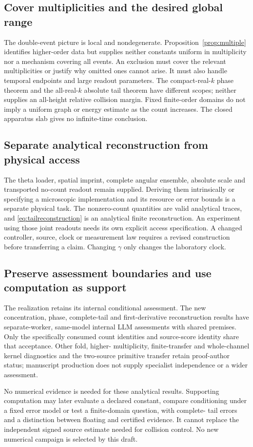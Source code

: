 \subsection{Cover multiplicities and the desired global range}
The double-event picture is local and nondegenerate.
Proposition~\ref{prop:multiple} identifies higher-order data but supplies
neither constants uniform in multiplicity nor a mechanism covering all
events. An exclusion must cover the relevant multiplicities or justify
why omitted ones cannot arise. It must also handle temporal endpoints and
large readout parameters. The compact-real-$k$ phase theorem and the
all-real-$k$ absolute tail theorem have different scopes; neither supplies
an all-height relative collision margin. Fixed finite-order domains do not
imply a uniform graph or energy estimate as the count increases. The
closed apparatus slab gives no infinite-time conclusion.

\subsection{Separate analytical reconstruction from physical access}
The theta loader, spatial imprint, complete angular ensemble, absolute
scale and transported no-count readout remain supplied. Deriving them
intrinsically or specifying a microscopic implementation and its resource
or error bounds is a separate physical task. The nonzero-count quantities
are valid analytical traces, and \eqref{eq:tailreconstruction} is an
analytical finite reconstruction. An experiment using those joint
readouts needs its own explicit access specification. A changed controller,
source, clock or measurement law requires a revised construction before
transferring a claim. Changing $\gamma$ only changes the laboratory clock.

\subsection{Preserve assessment boundaries and use computation as support}
The realization retains its internal conditional assessment. The new
concentration, phase, complete-tail and first-derivative reconstruction
results have separate-worker, same-model internal LLM assessments with
shared premises. Only the specifically consumed count identities and
source-score identity share that acceptance. Other fold, higher-
multiplicity, finite-transfer and whole-channel kernel diagnostics and
the two-source primitive transfer retain
proof-author status; manuscript production does not supply specialist
independence or a wider assessment.

No numerical evidence is needed for these analytical results. Supporting
computation may later evaluate a declared constant, compare conditioning
under a fixed error model or test a finite-domain question, with complete-
tail errors and a distinction between floating and certified evidence.
It cannot replace the independent signed source estimate needed for
collision control. No new numerical campaign is selected by this draft.
